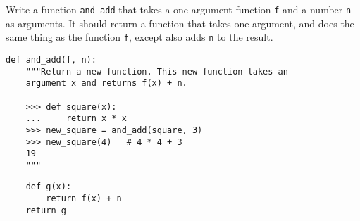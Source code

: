 \question Write a function \texttt{and\_add} that takes a one-argument function
\texttt{f} and a number \texttt{n} as arguments. It should return a function
that takes one argument, and does the same thing as the function \texttt{f},
except also adds \texttt{n} to the result.

\begin{lstlisting}
def and_add(f, n):
    """Return a new function. This new function takes an
    argument x and returns f(x) + n.

    >>> def square(x):
    ...     return x * x
    >>> new_square = and_add(square, 3)
    >>> new_square(4)   # 4 * 4 + 3
    19
    """
\end{lstlisting}
\begin{solution}[1in]
\begin{lstlisting}
    def g(x):
        return f(x) + n
    return g
\end{lstlisting}
\end{solution}
